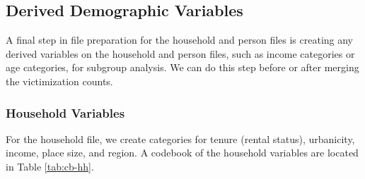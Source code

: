 \documentclass[
]{krantz}
\begin{document}
\hypertarget{derived-demographic-variables}{%
\subsection{Derived Demographic Variables}\label{derived-demographic-variables}}

A final step in file preparation for the household and person files is creating any derived variables on the household and person files, such as income categories or age categories, for subgroup analysis. We can do this step before or after merging the victimization counts.

\hypertarget{household-variables}{%
\subsubsection{Household Variables}\label{household-variables}}

For the household file, we create categories for tenure (rental status), urbanicity, income, place size, and region. A codebook of the household variables are located in Table \ref{tab:cb-hh}.
\end{document}

